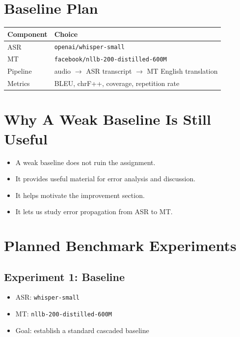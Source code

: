 \documentclass[11pt,a4paper]{article}
\begin{document}
\section{Baseline Plan}

\begin{longtable}{>{\raggedright\arraybackslash}p{} >{\raggedright\arraybackslash}p{}}
\toprule
Component & Choice \\
\midrule
ASR & \texttt{openai/whisper-small} \\
MT & \texttt{facebook/nllb-200-distilled-600M} \\
Pipeline & audio $\rightarrow$ ASR transcript $\rightarrow$ MT English translation \\
Metrics & BLEU, chrF++, coverage, repetition rate \\
\bottomrule
\end{longtable}

\section{Why A Weak Baseline Is Still Useful}

\begin{itemize}[leftmargin=1.4em]
  \item A weak baseline does not ruin the assignment.
  \item It provides useful material for error analysis and discussion.
  \item It helps motivate the improvement section.
  \item It lets us study error propagation from ASR to MT.
\end{itemize}

\section{Planned Benchmark Experiments}

\subsection{Experiment 1: Baseline}

\begin{itemize}[leftmargin=1.4em]
  \item ASR: \texttt{whisper-small}
  \item MT: \texttt{nllb-200-distilled-600M}
  \item Goal: establish a standard cascaded baseline
\end{itemize}
\end{document}
